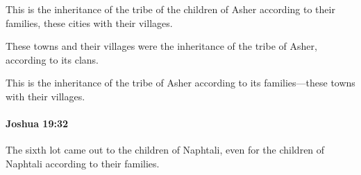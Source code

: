 			\begin{versebox}
					\item[BHS] 
					\item[ASV] This is the inheritance of the tribe of the children of Asher according to their families, these cities with their villages.
					\item[NIV] These towns and their villages were the inheritance of the tribe of Asher, according to its clans.
					\item[NRSV] This is the inheritance of the tribe of Asher according to its families—these towns with their villages.
			\end{versebox}

		\paragraph{Joshua 19:32} %
			\label{JOSHUA-19-32}

			The sixth lot came out to the children of Naphtali, even for the children of Naphtali according to their families.


